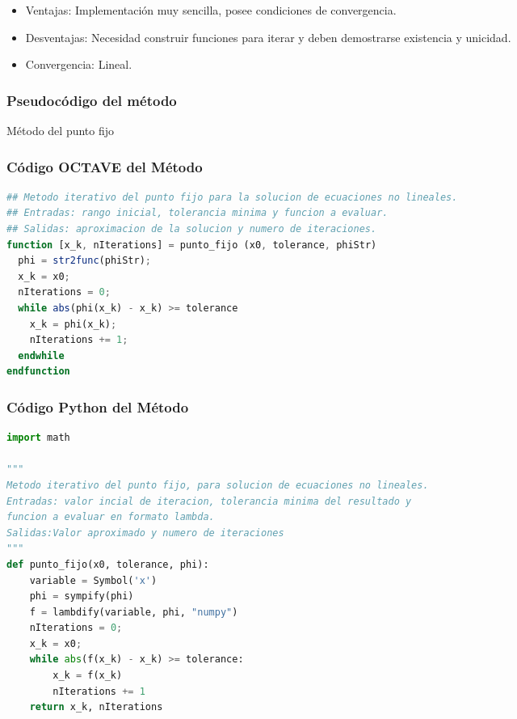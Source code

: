 \documentclass[12pt]{article}
\begin{document}
\begin{itemize}
    \item Ventajas: Implementación muy sencilla, posee condiciones de convergencia. 
    \item Desventajas: Necesidad construir funciones para iterar y deben demostrarse existencia y unicidad.
    \item Convergencia: Lineal.
\end{itemize}

\subsubsection{Pseudocódigo del método}
\begin{algorithm}[H]
\caption{Método del punto fijo}
     \SetAlgoLined
\end{algorithm}

\subsubsection{Código OCTAVE del Método}

\begin{lstlisting}[language=OCTAVE, caption=Implementación del método del punto fijo en Octave]
## Metodo iterativo del punto fijo para la solucion de ecuaciones no lineales.
## Entradas: rango inicial, tolerancia minima y funcion a evaluar.
## Salidas: aproximacion de la solucion y numero de iteraciones.
function [x_k, nIterations] = punto_fijo (x0, tolerance, phiStr)
  phi = str2func(phiStr);
  x_k = x0;
  nIterations = 0;
  while abs(phi(x_k) - x_k) >= tolerance
    x_k = phi(x_k);
    nIterations += 1;
  endwhile
endfunction
\end{lstlisting}

\subsubsection{Código Python del Método}

\begin{lstlisting}[language=Python, caption=Implementación del método del punto fijo en Python]
import math

"""
Metodo iterativo del punto fijo, para solucion de ecuaciones no lineales.
Entradas: valor incial de iteracion, tolerancia minima del resultado y
funcion a evaluar en formato lambda.
Salidas:Valor aproximado y numero de iteraciones
"""
def punto_fijo(x0, tolerance, phi):
    variable = Symbol('x')
    phi = sympify(phi)
    f = lambdify(variable, phi, "numpy")
    nIterations = 0;
    x_k = x0;
    while abs(f(x_k) - x_k) >= tolerance:
        x_k = f(x_k)
        nIterations += 1
    return x_k, nIterations
\end{lstlisting}
\end{document}
